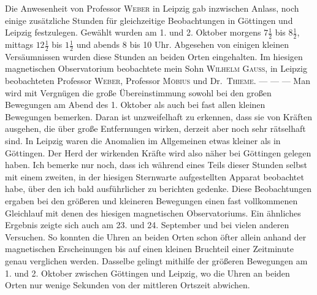 Die Anwesenheit von Professor \textsc{Weber} in Leipzig gab inzwischen Anlass, noch einige zusätzliche Stunden für gleichzeitige Beobachtungen in Göttingen und Leipzig festzulegen. Gewählt wurden am 1. und 2. Oktober morgens $7\tfrac12$ bis $8\tfrac12$, mittags $12\tfrac12$ bis $1\tfrac12$ und abends 8 bis 10 Uhr. Abgesehen von einigen kleinen Versäumnissen wurden diese Stunden an beiden Orten eingehalten. Im hiesigen magnetischen Observatorium beobachtete mein Sohn \textsc{Wilhelm Gauss}, in Leipzig beobachteten Professor \textsc{Weber}, Professor \textsc{Möbius} und Dr.\ \textsc{Thieme}. — — — Man wird mit Vergnügen die große Übereinstimmung sowohl bei den großen Bewegungen am Abend des 1. Oktober als auch bei fast allen kleinen Bewegungen bemerken. Daran ist unzweifelhaft zu erkennen, dass sie von Kräften ausgehen, die über große Entfernungen wirken, derzeit aber noch sehr rätselhaft sind. In Leipzig waren die Anomalien im Allgemeinen etwas kleiner als in Göttingen. Der Herd der wirkenden Kräfte wird also näher bei Göttingen gelegen haben. Ich bemerke nur noch, dass ich während eines Teils dieser Stunden selbst mit einem zweiten, in der hiesigen Sternwarte aufgestellten Apparat beobachtet habe, über den ich bald ausführlicher zu berichten gedenke. Diese Beobachtungen ergaben bei den größeren und kleineren Bewegungen einen fast vollkommenen Gleichlauf mit denen des hiesigen magnetischen Observatoriums. Ein ähnliches Ergebnis zeigte sich auch am 23. und 24. September und bei vielen anderen Versuchen. So konnten die Uhren an beiden Orten schon öfter allein anhand der magnetischen Erscheinungen bis auf einen kleinen Bruchteil einer Zeitminute genau verglichen werden. Dasselbe gelingt mithilfe
der größeren Bewegungen am 1. und 2. Oktober zwischen Göttingen und Leipzig, wo die Uhren an beiden Orten nur wenige Sekunden von der mittleren Ortszeit abwichen.

